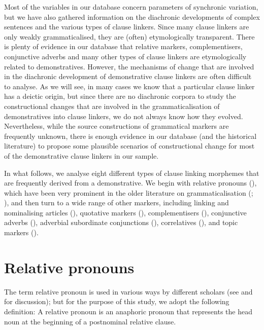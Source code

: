 \documentclass[output=paper,colorlinks,citecolor=brown]{langscibook}
\begin{document}
Most of the variables in our database concern parameters of synchronic variation, but we have also gathered information on the diachronic developments of complex sentences and the various types of clause linkers. Since many clause linkers are only weakly grammaticalised, they are (often) etymologically transparent. There is plenty of evidence in our database that relative markers, complementisers, conjunctive adverbs and many other types of clause linkers are etymologically related to demonstratives. However, the mechanisms of change that are involved in the diachronic development of demonstrative clause linkers are often difficult to analyse. As we will see, in many cases we know that a particular clause linker has a deictic origin, but since there are no diachronic corpora to study the constructional changes that are involved in the grammaticalisation of demonstratives into clause linkers, we do not always know how they evolved. Nevertheless, while the source constructions of grammatical markers are frequently unknown, there is enough evidence in our database (and the historical literature) to propose some plausible scenarios of constructional change for most of the demonstrative clause linkers in our sample.

In what follows, we analyse eight different types of clause linking morphemes that are frequently derived from a demonstrative. We begin with relative pronouns (), which have been very prominent in the older literature on grammaticalisation (\citealt{Brugmann1904}; \citealt[402]{Bühler1934}), and then turn to a wide range of other markers, including linking and nominalising articles (), quotative markers (), complementisers (), conjunctive adverbs (), adverbial subordinate conjunctions (), correlatives (), and topic markers ().

\section{Relative pronouns}\label{sec:diessel:2}

The term relative pronoun is used in various ways by different scholars (see \citet[248-252]{Lehmann1984} and \citet{VanderAuwera1985} for discussion); but for the purpose of this study, we adopt the following definition: A relative pronoun is an anaphoric pronoun that represents the head noun at the beginning of a postnominal relative clause.
\end{document}
